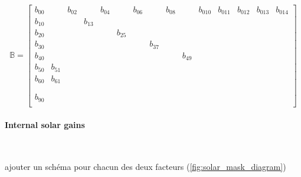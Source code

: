 \documentclass[11pt]{article}
\begin{document}
        \begin{equation}
          \mathbb{B} = \begin{bmatrix}
  b_{00} &        & b_{02} &        & b_{04} &        & b_{06} &        & b_{08} &        & b_{010}& b_{011}& b_{012}& b_{013}& b_{014}\\
  b_{10} &        &        & b_{13} &        &        &        &        &        &        &        &        &        &        &       \\
  b_{20} &        &        &        &        & b_{25} &        &        &        &        &        &        &        &        &       \\
  b_{30} &        &        &        &        &        &        & b_{37} &        &        &        &        &        &        &       \\
  b_{40} &        &        &        &        &        &        &        &        & b_{49} &        &        &        &        &       \\
  b_{50} & b_{51} &        &        &        &        &        &        &        &        &        &        &        &        &       \\
  b_{60} & b_{61} &        &        &        &        &        &        &        &        &        &        &        &        &       \\
         &        &        &        &        &        &        &        &        &        &        &        &        &        &       \\
         &        &        &        &        &        &        &        &        &        &        &        &        &        &       \\
  b_{90} &        &        &        &        &        &        &        &        &        &        &        &        &        &       \\
\end{bmatrix}
        \end{equation}



            \paragraph{Internal solar gains}\mbox{}\\ %
            \label{par:internal_solar_gains}

            ajouter un schéma pour chacun des deux facteurs (\ref{fig:solar_mask_diagram})
\end{document}
